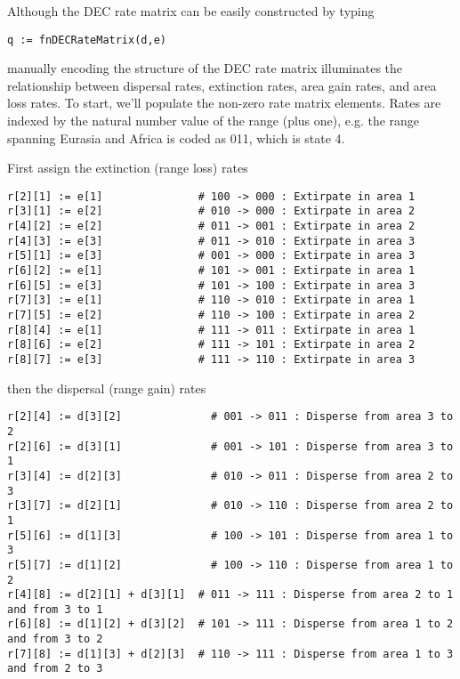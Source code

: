 Although the DEC rate matrix can be easily constructed by typing

\begin{snugshade}
\begin{lstlisting}
q := fnDECRateMatrix(d,e)
\end{lstlisting}
\end{snugshade}

manually encoding the structure of the DEC rate matrix illuminates the relationship between dispersal rates, extinction rates, area gain rates, and area loss rates.
To start, we'll populate the non-zero rate matrix elements.
Rates are indexed by the natural number value of the range (plus one), e.g. the range spanning Eurasia and Africa is coded as 011, which is state 4.

First assign the extinction (range loss) rates

\begin{snugshade}
\begin{lstlisting}
r[2][1] := e[1]               # 100 -> 000 : Extirpate in area 1
r[3][1] := e[2]               # 010 -> 000 : Extirpate in area 2
r[4][2] := e[2]               # 011 -> 001 : Extirpate in area 2
r[4][3] := e[3]               # 011 -> 010 : Extirpate in area 3
r[5][1] := e[3]               # 001 -> 000 : Extirpate in area 3
r[6][2] := e[1]               # 101 -> 001 : Extirpate in area 1
r[6][5] := e[3]               # 101 -> 100 : Extirpate in area 3
r[7][3] := e[1]               # 110 -> 010 : Extirpate in area 1
r[7][5] := e[2]               # 110 -> 100 : Extirpate in area 2
r[8][4] := e[1]               # 111 -> 011 : Extirpate in area 1
r[8][6] := e[2]               # 111 -> 101 : Extirpate in area 2
r[8][7] := e[3]               # 111 -> 110 : Extirpate in area 3
\end{lstlisting}
\end{snugshade}

then the dispersal (range gain) rates

\begin{snugshade}
\begin{lstlisting}
r[2][4] := d[3][2]              # 001 -> 011 : Disperse from area 3 to 2
r[2][6] := d[3][1]              # 001 -> 101 : Disperse from area 3 to 1
r[3][4] := d[2][3]              # 010 -> 011 : Disperse from area 2 to 3
r[3][7] := d[2][1]              # 010 -> 110 : Disperse from area 2 to 1
r[5][6] := d[1][3]              # 100 -> 101 : Disperse from area 1 to 3
r[5][7] := d[1][2]              # 100 -> 110 : Disperse from area 1 to 2
r[4][8] := d[2][1] + d[3][1]  # 011 -> 111 : Disperse from area 2 to 1 and from 3 to 1
r[6][8] := d[1][2] + d[3][2]  # 101 -> 111 : Disperse from area 1 to 2 and from 3 to 2
r[7][8] := d[1][3] + d[2][3]  # 110 -> 111 : Disperse from area 1 to 3 and from 2 to 3
\end{lstlisting}
\end{snugshade}

